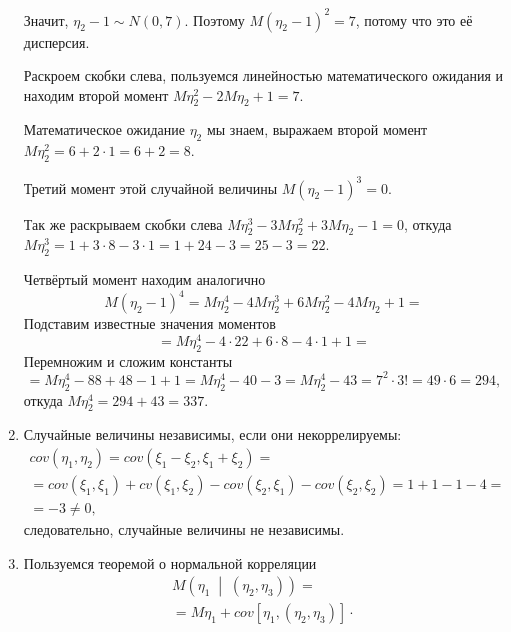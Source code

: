 \begin{enumerate}[label=\alph*)]
  Значит, $ \eta_2 - 1 \sim N \left( 0, 7 \right) $.
  Поэтому $M \left( \eta_2 - 1 \right)^2 = 7$, потому что это её дисперсия.

  Раскроем скобки слева,
  пользуемся линейностью математического ожидания и находим второй момент
  $M \eta_2^2 - 2M \eta_2 + 1 =
    7$.

  Математическое ожидание $ \eta_2$ мы знаем, выражаем второй момент
  $M \eta_2^2 =
    6 + 2 \cdot 1 =
    6 + 2 =
    8$.

  Третий момент этой случайной величины $M \left( \eta_2 - 1 \right)^3 = 0$.

  Так же раскрываем скобки слева $M \eta_2^3 - 3M \eta_2^2 + 3M \eta_2 - 1 = 0$,
  откуда $M \eta_2^3 = 1 + 3 \cdot 8 - 3 \cdot 1 = 1 + 24 - 3 = 25 - 3 = 22$.

  Четвёртый момент находим аналогично
  \begin{equation*}
    M \left( \eta_2 - 1 \right)^4 =
    M \eta_2^4 - 4M \eta_2^3 + 6M \eta_2^2 - 4M \eta_2 + 1 =
  \end{equation*}
  Подставим известные значения моментов
  \begin{equation*}
    = M \eta_2^4 - 4 \cdot 22 + 6 \cdot 8 - 4 \cdot 1 + 1 =
  \end{equation*}
  Перемножим и сложим константы
  \begin{equation*}
    = M \eta_2^4 - 88 + 48 - 1 + 1 =
    M \eta_2^4 - 40 - 3 =
    M \eta_2^4 - 43 =
    7^2 \cdot 3! =
    49 \cdot 6 =
    294,
  \end{equation*}
  откуда $M \eta_2^4 = 294 + 43 = 337$.
  \item Случайные величины независимы, если они некоррелируемы:
  \begin{gather*}
    cov \left( \eta_1, \eta_2 \right) =
    cov \left( \xi_1 - \xi_2, \xi_1 + \xi_2 \right) = \\
    = cov \left( \xi_1, \xi_1 \right) + cv \left( \xi_1, \xi_2 \right) -
    cov \left( \xi_2, \xi_1 \right) - cov \left( \xi_2, \xi_2 \right) =
    1 + 1 - 1 - 4 = \\
    = -3 \neq
    0,
  \end{gather*}
  следовательно, случайные величины не независимы.
  \item Пользуемся теоремой о нормальной корреляции
  \begin{gather*}
    M \left( \eta_1 \; \middle| \; \left( \eta_2, \eta_3 \right) \right) = \\
    = M \eta_1 + cov \left[ \eta_1, \left( \eta_2, \eta_3 \right) \right] \cdot

\end{gather*}
\end{enumerate}
